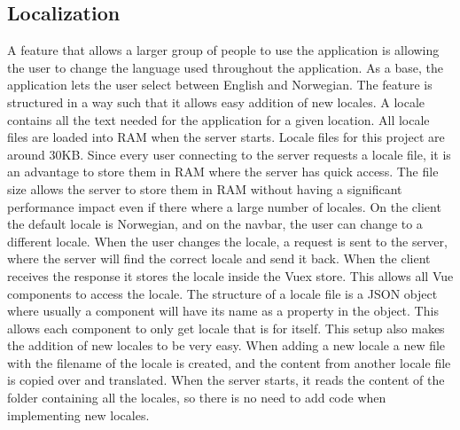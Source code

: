 \subsection{Localization}
A feature that allows a larger group of people to use the application is allowing the user to change the language used throughout the application. As a base, the application lets the user select between English and Norwegian. The feature is structured in a way such that it allows easy addition of new locales. A locale contains all the text needed for the application for a given location. All locale files are loaded into RAM when the server starts. Locale files for this project are around 30KB. Since every user connecting to the server requests a locale file, it is an advantage to store them in RAM where the server has quick access. The file size allows the server to store them in RAM without having a significant performance impact even if there where a large number of locales. On the client the default locale is Norwegian, and on the navbar, the user can change to a different locale. When the user changes the locale, a request is sent to the server, where the server will find the correct locale and send it back. When the client receives the response it stores the locale inside the Vuex store. This allows all Vue components to access the locale. The structure of a locale file is a JSON object where usually a component will have its name as a property in the object. This allows each component to only get locale that is for itself. This setup also makes the addition of new locales to be very easy. When adding a new locale a new file with the filename of the locale is created, and the content from another locale file is copied over and translated. When the server starts, it reads the content of the folder containing all the locales, so there is no need to add code when implementing new locales.